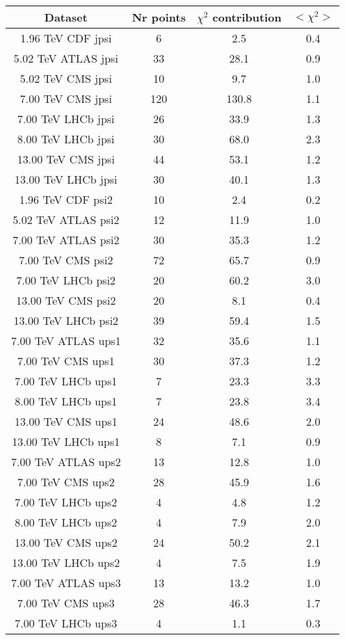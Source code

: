 \begin{table}[h!]
\centering
\begin{tabular}{c|c|c|c}
Dataset & Nr points & $\chi^2$ contribution & $<\chi^2>$ \\
\hline
1.96 TeV CDF jpsi & 6 & 2.5 & 0.4 \\
5.02 TeV ATLAS jpsi & 33 & 28.1 & 0.9 \\
5.02 TeV CMS jpsi & 10 & 9.7 & 1.0 \\
7.00 TeV CMS jpsi & 120 & 130.8 & 1.1 \\
7.00 TeV LHCb jpsi & 26 & 33.9 & 1.3 \\
8.00 TeV LHCb jpsi & 30 & 68.0 & 2.3 \\
13.00 TeV CMS jpsi & 44 & 53.1 & 1.2 \\
13.00 TeV LHCb jpsi & 30 & 40.1 & 1.3 \\
1.96 TeV CDF psi2 & 10 & 2.4 & 0.2 \\
5.02 TeV ATLAS psi2 & 12 & 11.9 & 1.0 \\
7.00 TeV ATLAS psi2 & 30 & 35.3 & 1.2 \\
7.00 TeV CMS psi2 & 72 & 65.7 & 0.9 \\
7.00 TeV LHCb psi2 & 20 & 60.2 & 3.0 \\
13.00 TeV CMS psi2 & 20 & 8.1 & 0.4 \\
13.00 TeV LHCb psi2 & 39 & 59.4 & 1.5 \\
7.00 TeV ATLAS ups1 & 32 & 35.6 & 1.1 \\
7.00 TeV CMS ups1 & 30 & 37.3 & 1.2 \\
7.00 TeV LHCb ups1 & 7 & 23.3 & 3.3 \\
8.00 TeV LHCb ups1 & 7 & 23.8 & 3.4 \\
13.00 TeV CMS ups1 & 24 & 48.6 & 2.0 \\
13.00 TeV LHCb ups1 & 8 & 7.1 & 0.9 \\
7.00 TeV ATLAS ups2 & 13 & 12.8 & 1.0 \\
7.00 TeV CMS ups2 & 28 & 45.9 & 1.6 \\
7.00 TeV LHCb ups2 & 4 & 4.8 & 1.2 \\
8.00 TeV LHCb ups2 & 4 & 7.9 & 2.0 \\
13.00 TeV CMS ups2 & 24 & 50.2 & 2.1 \\
13.00 TeV LHCb ups2 & 4 & 7.5 & 1.9 \\
7.00 TeV ATLAS ups3 & 13 & 13.2 & 1.0 \\
7.00 TeV CMS ups3 & 28 & 46.3 & 1.7 \\
7.00 TeV LHCb ups3 & 4 & 1.1 & 0.3 \\

\end{tabular}
\end{table}
